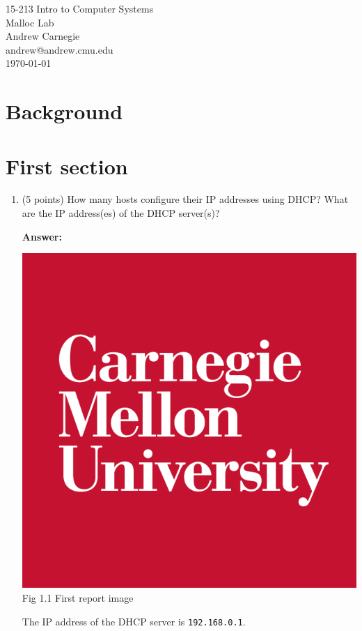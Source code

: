 \documentclass[10pt]{article}
\makeatletter
\newcommand{\myclass}{15-213 Intro to Computer Systems}
\newcommand{\myhwname}{Malloc Lab}
\newcommand{\myname}{Andrew Carnegie}
\newcommand{\myandrew}{andrew@andrew.cmu.edu}
\makeatother
\begin{document}
\begin{center}
  {\Large \myclass{}} \\
  {\large{\myhwname}} \\
  \myname \\
  \myandrew \\
  \today
\end{center}

\section{Background}

\section{First section}

\begin{enumerate}
\setcounter{enumi}{0}

\item (5 points) How many hosts configure their IP addresses using DHCP?
What are the IP address(es) of the DHCP server(s)?

\textbf{Answer: }

\begin{center}
  \includegraphics[scale=0.3]{cmu.png}\\
  \small{Fig 1.1 First report image}
\end{center}

The IP address of the DHCP server is \verb|192.168.0.1|.

\end{enumerate}
\end{document}
